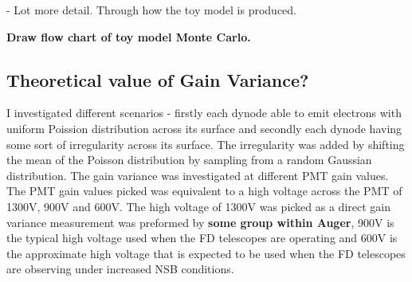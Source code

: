 - Lot more detail. Through how the toy model is produced.

\textbf{Draw flow chart of toy model Monte Carlo.}

\subsection{Theoretical value of Gain Variance?}

I investigated different scenarios - firstly each dynode able to emit electrons with uniform Poission distribution across its surface and secondly each dynode having some sort of irregularity across its surface. The irregularity was added by shifting the mean of the Poisson distribution by sampling from a random Gaussian distribution. The gain variance was investigated at different PMT gain values. The PMT gain values picked was equivalent to a high voltage across the PMT of 1300V, 900V and 600V. The high voltage of 1300V was picked as a direct gain variance measurement was preformed by  \textbf{some group within Auger}, 900V is the typical high voltage used when the FD telescopes are operating and 600V is the approximate high voltage that is expected to be used when the FD telescopes are observing under increased NSB conditions. 

